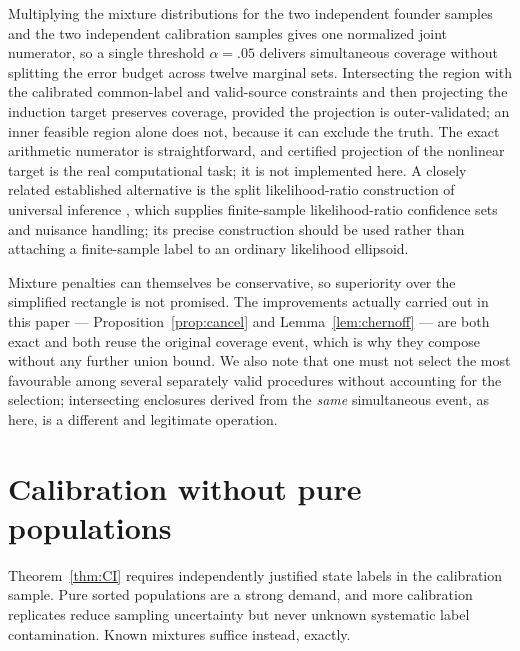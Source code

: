 \documentclass[11pt]{article}
\theoremstyle{definition}
\begin{document}
Multiplying the mixture distributions for the two independent founder samples
and the two independent calibration samples gives one normalized joint
numerator, so a single threshold $\alpha=.05$ delivers simultaneous coverage
without splitting the error budget across twelve marginal sets. Intersecting the
region with the calibrated common-label and valid-source constraints and then
projecting the induction target preserves coverage, provided the projection is
outer-validated; an inner feasible region alone does not, because it can exclude
the truth. The exact arithmetic numerator is straightforward, and certified
projection of the nonlinear target is the real computational task; it is not
implemented here. A closely related established alternative is the split
likelihood-ratio construction of universal inference \citep{wasserman2020},
which supplies finite-sample likelihood-ratio confidence sets and nuisance
handling; its precise construction should be used rather than attaching a
finite-sample label to an ordinary likelihood ellipsoid.

Mixture penalties can themselves be conservative, so superiority over the
simplified rectangle is not promised. The improvements actually carried out in
this paper --- Proposition~\ref{prop:cancel} and Lemma~\ref{lem:chernoff} ---
are both exact and both reuse the original coverage event, which is why they
compose without any further union bound. We also note that one must not select
the most favourable among several separately valid procedures without accounting
for the selection; intersecting enclosures derived from the \emph{same}
simultaneous event, as here, is a different and legitimate operation.

\section{Calibration without pure populations}\label{sec:calibration}
Theorem~\ref{thm:CI} requires independently justified state labels in the
calibration sample. Pure sorted populations are a strong demand, and more
calibration replicates reduce sampling uncertainty but never unknown systematic
label contamination. Known mixtures suffice instead, exactly.
\end{document}
